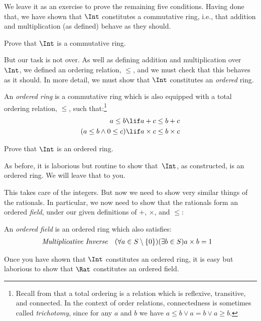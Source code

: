 \documentclass[../../../include/open-logic-section]{subfiles}
\begin{document}
We leave it as an exercise to prove the remaining five conditions.
Having done that, we have shown that $\Int$ constitutes a commutative
ring, i.e., that addition and multiplication (as defined) behave as
they should.

\begin{prob}
Prove that $\Int$ is a commutative ring.
\end{prob}

But our task is not over. As well as defining addition and
multiplication over $\Int$, we defined an ordering relation, $\leq$,
and we must check that this behaves as it should. In more detail, we
must show that $\Int$ constitutes an \emph{ordered} ring.

\begin{defn}
An \emph{ordered ring} is a commutative ring which is also equipped
with a total ordering relation, $\leq$, such that:\footnote{Recall
from  that a total ordering
is a relation which is reflexive, transitive, and connected. In the
context of order relations, connectedness is sometimes called
\emph{trichotomy}, since for any $a$ and $b$ we have $a \leq b \lor a
= b \lor a \geq b$.} 
\begin{align*}
	a \leq b &\lif a + c \leq b + c\\
	(a \leq b \land 0 \leq c) &\lif a \times c \leq b \times c
\end{align*}
\end{defn}

\begin{prob}
Prove that $\Int$ is an ordered ring. 
\end{prob}

As before, it is laborious but routine to show that~$\Int$, as
constructed, is an ordered ring. We will leave that to you.

This takes care of the integers. But now we need to show very similar
things of the rationals. In particular, we now need to show that the
rationals form an ordered \emph{field}, under our given definitions of
$+$, $\times$, and $\leq$:
\begin{defn}
An \emph{ordered field} is an ordered ring which also satisfies:
\begin{align*}
	\emph{Multiplicative Inverse}& & (\forall a \in S \setminus \{0\})(\exists b \in S) a\times b& = 1
\end{align*}
\end{defn}

Once you have shown that $\Int$ constitutes an ordered ring, it is
easy but laborious to show that $\Rat$ constitutes an ordered field.
\end{document}
